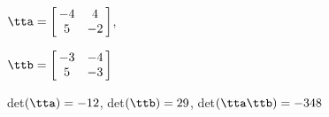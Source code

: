 {$\tta = \left[\hskip -3pt \begin{array}{cc} -4&4\\  5&-2\end {array} \hskip -3pt
 \right]$, 

$\ttb = \left[\hskip -3pt \begin{array}{cc} -3&-4\\  5&-3\end {array} \hskip -3pt
 \right]$}
{det$(\tta)=-12$, det$(\ttb)=29$, det$(\tta\ttb)=-348$}






  

